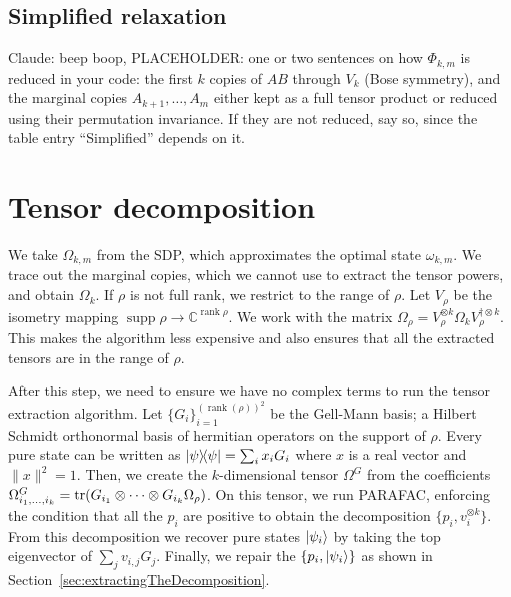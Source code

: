 \documentclass[aps,pra,twocolumn,showpacs,superscriptaddress,groupedaddress]{revtex4-2}
\newcommand{\claude}[1]{{\color{claudeorange} Claude: beep boop, #1}}
\newcommand{\C}{\mathds{C}}
\begin{document}
\begin{widetext}
\subsection{Simplified relaxation}
\claude{PLACEHOLDER: one or two sentences on how $\Phi_{k,m}$ is reduced in your code: the first $k$ copies of $AB$ through $V_k$ (Bose symmetry), and the marginal copies $A_{k+1},\dots,A_m$ either kept as a full tensor product or reduced using their permutation invariance. If they are not reduced, say so, since the table entry ``Simplified'' depends on it.}

\section{Tensor decomposition}\label{app:tensor}
We take $\Omega_{k,m}$ from the SDP, which approximates the optimal state $\omega_{k,m}$.
We trace out the marginal copies, which we cannot use to extract the tensor powers, and obtain $\Omega_k$.
If $\rho$ is not full rank, we restrict to the range of $\rho$. Let $V_\rho$ be the isometry mapping $\operatorname{supp} \rho \to \C^{\operatorname{rank} \rho}$. We work with the matrix $\Omega_\rho = V_\rho^{\otimes k} \Omega_k V_\rho^{\dagger\otimes k}$. This makes the algorithm less expensive and also ensures that all the extracted tensors are in the range of $\rho$.

After this step, we need to ensure we have no complex terms to run the tensor extraction algorithm. Let $\{G_i\}_{i=1}^{(\operatorname{rank}(\rho))^2}$ be the Gell-Mann basis; a Hilbert Schmidt orthonormal basis of hermitian operators on the support of $\rho$. Every pure state can be written as $\dyad{\psi} = \sum_i x_i G_i$ where $x$ is a real vector and $\|x\|^2 = 1$. Then, we create the $k$-dimensional tensor $\Omega^G$ from the coefficients $\Omega^G_{i_1, \dots, i_k} = \tr(G_{i_1} \otimes \dots \otimes G_{i_k} \Omega_\rho)$. On this tensor, we run PARAFAC, enforcing the condition that all the $p_i$ are positive to obtain the decomposition $\{p_i, v_i^{\otimes k}\}$. From this decomposition we recover pure states $\ket{\psi_i}$ by taking the top eigenvector of $\sum_j v_{i,j} G_j$. Finally, we repair the $\{p_i, \ket{\psi_i}\}$ as shown in Section~\ref{sec:extractingTheDecomposition}.


\end{widetext}
\end{document}
